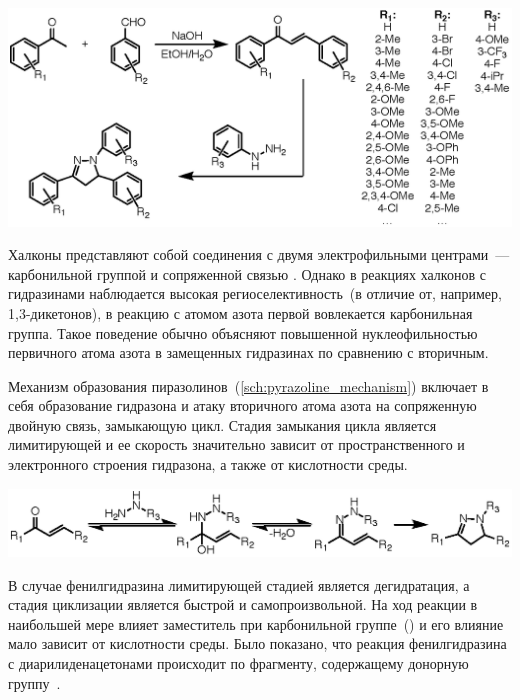 \begin{scheme}[h!]
    \centering
    \includegraphics{sections/literature/img/pyrazolines_common.eps}
    \caption{}
    \label{sch:pyrazolines_common}
\end{scheme}

Халконы представляют собой соединения с двумя электрофильными центрами~--- карбонильной группой и сопряженной связью .
Однако в реакциях халконов с гидразинами наблюдается высокая региоселективность~(в отличие от, например, 1,3-дикетонов), в реакцию с атомом азота первой вовлекается карбонильная группа.
Такое поведение обычно объясняют повышенной нуклеофильностью первичного атома азота в замещенных гидразинах по сравнению с вторичным.

Механизм образования пиразолинов~(\ref{sch:pyrazoline_mechanism}) включает в себя образование гидразона и атаку вторичного атома азота на сопряженную двойную связь, замыкающую цикл.
Стадия замыкания цикла является лимитирующей и ее скорость значительно зависит от пространственного и электронного строения гидразона, а также от кислотности среды.

\begin{scheme}[h!]
    \centering
    \includegraphics{sections/literature/img/pyrazoline_mechanism.eps}
    \caption{}
    \label{sch:pyrazoline_mechanism}
\end{scheme}

В случае фенилгидразина лимитирующей стадией является дегидратация, а стадия циклизации является быстрой и самопроизвольной.
На ход реакции в наибольшей мере влияет заместитель при карбонильной группе~() и его влияние мало зависит от кислотности среды.
Было показано, что реакция фенилгидразина с диарилиденацетонами происходит по фрагменту, содержащему донорную группу~\cite{Chebanov2008}.

